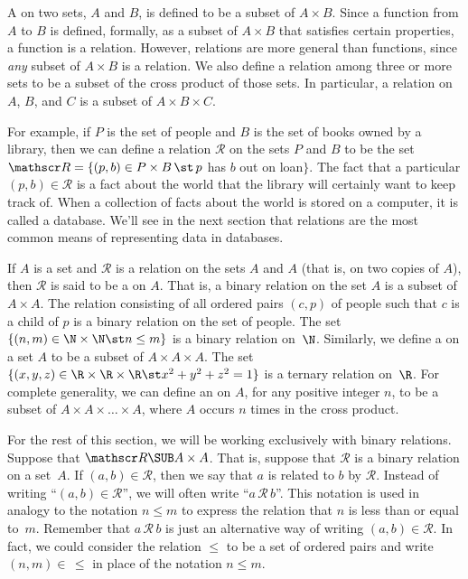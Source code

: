 A  on two sets, $A$ and $B$, is defined to be a subset
of $A\times B$.  Since a function from $A$ to $B$ is defined, formally, as
a subset of $A\times B$ that satisfies certain properties, a function
is a relation.  However, relations are more general than functions,
since \emph{any} subset of $A\times B$ is a relation.  We also
define a relation among three or more sets to be a subset of the
cross product of those sets.  In particular, a relation on
$A$, $B$, and $C$ is a subset of $A\times B\times C$.

For example, if $P$ is the set of people and $B$ is the set of books owned
by a library, then we can define a relation ${\mathscr R}$ on the sets
$P$ and $B$ to be the set ${\mathscr R}=\{(p,b)\in P\times B\,\st\, p$
has $b$ out on loan$\}$.  The fact that a particular 
$(p,b)\in{\mathscr R}$ is a fact about the world that the library
will certainly want to keep track of.  When a collection of
facts about the world is stored on a computer, it is called
a database.  We'll see in the next section that
relations are the most common means of representing data in
databases.

If $A$ is a set and ${\mathscr R}$ is a relation on the sets $A$ and
$A$ (that is, on two copies of $A$), then $\mathscr R$ is said to be a  on
$A$.  That is, a binary relation on the set $A$ is a subset of
$A\times A$.  The relation consisting of all ordered pairs
$(c,p)$ of people such that $c$ is a child of $p$ is a binary
relation on the set of people.  The set $\{(n,m)\in\N\times\N\st n\le m\}$
is a binary relation on~$\N$.  Similarly, we define
a  on a set $A$ to be a subset of $A\times A\times A$.
The set $\{(x,y,z)\in\R\times\R\times\R\st x^2+y^2+z^2=1\}$ is
a ternary relation on~$\R$.  For complete generality, we can
define an  on $A$, for any positive integer $n$,
to be a subset of $A\times A\times\dots\times A$, where
$A$ occurs $n$ times in the cross product.

For the rest of this section, we will be working exclusively with binary
relations.  Suppose that ${\mathscr R}\SUB A\times A$. That is, suppose
that ${\mathscr R}$ is a binary relation on a set~$A$.
If $(a,b)\in{\mathscr R}$, then we say that $a$ is related to
$b$ by ${\mathscr R}$.  Instead of writing ``$(a,b)\in {\mathscr R}$'',
we will often write ``$a\,{\mathscr R}\,b$''.  This notation is
used in analogy to the notation $n\le m$ to express the relation
that $n$ is less than or equal to~$m$.  Remember that
$a\,{\mathscr R}\,b$ is just an alternative way of writing $(a,b)\in{\mathscr R}$.
In fact, we could consider the relation $\le$ to be a set of
ordered pairs and write $(n,m)\in\,\le$ in place of the notation $n\le m$.


